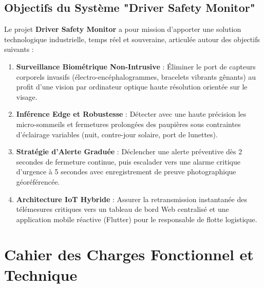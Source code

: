 \documentclass[11pt,a4paper]{article}
\begin{document}
\subsection{Objectifs du Système "Driver Safety Monitor"}
Le projet \textbf{Driver Safety Monitor} a pour mission d'apporter une solution technologique industrielle, temps réel et souveraine, articulée autour des objectifs suivants :
\begin{enumerate}
    \item \textbf{Surveillance Biométrique Non-Intrusive} : Éliminer le port de capteurs corporels invasifs (électro-encéphalogrammes, bracelets vibrants gênants) au profit d'une vision par ordinateur optique haute résolution orientée sur le visage.
    \item \textbf{Inférence Edge et Robustesse} : Détecter avec une haute précision les micro-sommeils et fermetures prolongées des paupières sous contraintes d'éclairage variables (nuit, contre-jour solaire, port de lunettes).
    \item \textbf{Stratégie d'Alerte Graduée} : Déclencher une alerte préventive dès 2 secondes de fermeture continue, puis escalader vers une alarme critique d'urgence à 5 secondes avec enregistrement de preuve photographique géoréférencée.
    \item \textbf{Architecture IoT Hybride} : Assurer la retransmission instantanée des télémesures critiques vers un tableau de bord Web centralisé et une application mobile réactive (Flutter) pour le responsable de flotte logistique.
\end{enumerate}

\section{Cahier des Charges Fonctionnel et Technique}
\end{document}

